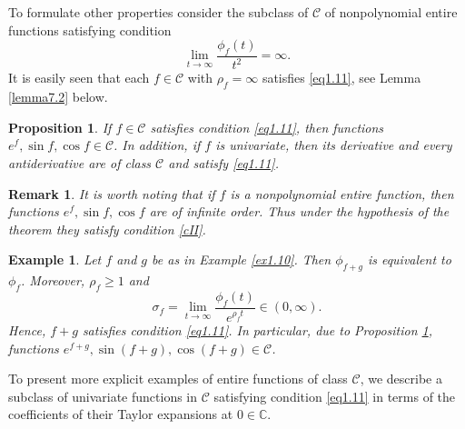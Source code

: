 \documentclass[11pt, oneside]{amsart}
\newtheorem{Proposition}[Th]{Proposition}
\newtheorem{R}[Th]{Remark}
\newtheorem{E}[Th]{Example}
\begin{document}
To formulate other properties consider the subclass of $\mathscr C$ of nonpolynomial entire functions satisfying condition
\begin{equation}\label{eq1.11}
\lim_{t\rightarrow\infty}\frac{\phi_f(t)}{t^2}=\infty.
\end{equation}
It is easily seen that each $f\in\mathscr C$ with $\rho_f=\infty$ satisfies \eqref{eq1.11}, see Lemma \ref{lemma7.2} below.
\begin{Proposition}\label{prop1.10}
If $f\in\mathscr C$ satisfies condition \eqref{eq1.11}, then  functions $e^f,\sin f,\cos f\in\mathscr C$.
In addition, if $f$ is univariate, then its derivative and every antiderivative are of class $\mathscr C$ and satisfy \eqref{eq1.11}.
\end{Proposition}
\begin{R}
{\rm It is worth noting that if $f$ is a nonpolynomial entire function, then functions $e^f, \sin f, \cos f$ are of infinite order. Thus under the hypothesis of the theorem they satisfy condition \eqref{cII}.
}
\end{R}
\begin{E}\label{ex1.12}
{\rm Let $f$ and $g$ be as in Example \ref{ex1.10}. Then $\phi_{f+g}$ is equivalent to $\phi_f$. Moreover, $\rho_f\ge 1$ and 
\[
\sigma_f=\lim_{t\rightarrow\infty}\frac{\phi_f(t)}{e^{\rho_f t}}\in (0,\infty).
\]
Hence, $f+g$ satisfies condition \eqref{eq1.11}. In particular, due to Proposition \ref{prop1.10}, functions $e^{f+g}, \sin(f+g), \cos(f+g)\in\mathscr C$.
}
\end{E}

To present more explicit examples of entire functions of class $\mathscr C$, we describe a subclass of univariate functions in $\mathscr C$ satisfying condition \eqref{eq1.11} in terms of the coefficients of their Taylor expansions at $0\in\mathbb C$.
\end{document}
